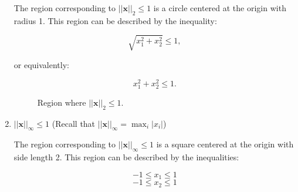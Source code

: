 \documentclass[letter]{article}
\theoremstyle{definition}
\newenvironment{soln}{
	\leavevmode\color{black}\ignorespaces
}{}
\begin{document}
\begin{enumerate}
                \begin{soln}
                    The region corresponding to $||\mathbf{x}||_2 \leq 1$ is a circle centered at the origin with radius 1. This region can be described by the inequality:
                
                    \[
                    \sqrt{x_1^2 + x_2^2} \leq 1,
                    \]
                
                    or equivalently:
                
                    \[
                    x_1^2 + x_2^2 \leq 1.
                    \]
                
                    
                
                    \begin{figure}[h!]
                        \centering
                        \caption{Region where $||\mathbf{x}||_2 \leq 1$.}
                        \label{fig:norm2}
                    \end{figure}
                \end{soln}
		\item 	$||\mathbf{x}||_\infty \leq 1$ (Recall that $||\mathbf{x}||_\infty = \max_i |x_i|$)
			
            \begin{soln}
                    The region corresponding to $||\mathbf{x}||_\infty \leq 1$ is a square centered at the origin with side length 2. This region can be described by the inequalities:
                
                    \[
                    -1 \leq x_1 \leq 1
                    \]
                    \[
                    -1 \leq x_2 \leq 1
                    \]
                
                    
                

\end{soln}
\end{enumerate}
\end{document}
